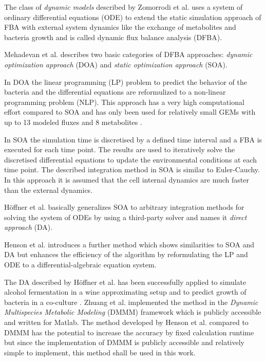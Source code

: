 The class of \textit{dynamic models} described by Zomorrodi et al. uses a system of ordinary
differential equations (ODE)
to extend the static simulation approach of FBA with external system dynamics like the exchange
of metabolites and bacteria growth and is called dynamic flux balance analysis (DFBA)\cite{zomorrodi_synthetic_2016}.

Mehadevan et al. describes two basic categories of DFBA approaches: \textit{dynamic optimization
approach} (DOA) and \textit{static optimization approach} (SOA)\cite{mahadevan_dynamic_2002}.

In DOA the linear programming (LP) problem to predict the behavior of the bacteria and the
differential equations are reformulized to a non-linear programming problem (NLP). 
This approach has a very high computational effort\cite{hoffner_reliable_2013} compared to SOA
and has only been used for relatively small GEMs with up to 13 modeled fluxes and 8 metabolites
\cite{luo_dynamic_2006} \cite{luo_photosynthetic_2009}.

In SOA the simulation time is discretised by a defined time interval and a FBA is executed for
each time point. The results are used to iteratively solve the discretised differential equations
to update the environmental conditions at each time point. The described integration method in SOA
is similar to Euler-Cauchy.
In this approach it is assumed that the cell internal dynamics are much faster than the external dynamics.

Höffner et al. basically generalizes SOA to arbitrary integration methods for solving the system of ODEs
by using a third-party solver and names it \textit{direct approach} (DA)\cite{hoffner_reliable_2013}.

Henson et al. introduces a further method which shows similarities to SOA and DA but enhances the efficiency of the
algorithm\cite{hoffner_reliable_2013} by reformulating the LP and ODE to a 
differential-algebraic equation system\cite{henson_dynamic_2014}.

The DA described by Höffner et al. has been successfully applied to simulate alcohol fermentation
in a wine approximating setup \cite{sainz_modeling_2003} \cite{pizarro_coupling_2007} and to
predict growth of bacteria in a co-culture \cite{hanly_dynamic_2011}. Zhuang et al. implemented
the method in the \textit{Dynamic Multispecies Metabolic Modeling} (DMMM) framework
which is publicly accessible and written for Matlab\cite{zhuang_design_2012}.
The method developed by Henson et al. compared to DMMM has the potential to increase the accuracy
by fixed calculation runtime but since the implementation of DMMM is publicly accessible and
relatively simple to implement, this method shall be used in this work.



